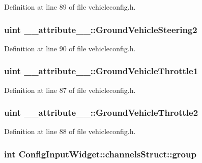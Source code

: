 \-Definition at line 89 of file vehicleconfig.\-h.

\hypertarget{group___config_plugin_gab404016de72261d048356e628b9ef0b7}{
\subsubsection[{\-Ground\-Vehicle\-Steering2}]{\setlength{\rightskip}{0pt plus 5cm}uint {\bf \-\_\-\-\_\-attribute\-\_\-\-\_\-\-::\-Ground\-Vehicle\-Steering2}}}\label{group___config_plugin_gab404016de72261d048356e628b9ef0b7}


\-Definition at line 90 of file vehicleconfig.\-h.

\hypertarget{group___config_plugin_ga755435654b7373fe879e991ccdd40757}{
\subsubsection[{\-Ground\-Vehicle\-Throttle1}]{\setlength{\rightskip}{0pt plus 5cm}uint {\bf \-\_\-\-\_\-attribute\-\_\-\-\_\-\-::\-Ground\-Vehicle\-Throttle1}}}\label{group___config_plugin_ga755435654b7373fe879e991ccdd40757}


\-Definition at line 87 of file vehicleconfig.\-h.

\hypertarget{group___config_plugin_ga6a8ae4214756c689b83b9f42a56c2505}{
\subsubsection[{\-Ground\-Vehicle\-Throttle2}]{\setlength{\rightskip}{0pt plus 5cm}uint {\bf \-\_\-\-\_\-attribute\-\_\-\-\_\-\-::\-Ground\-Vehicle\-Throttle2}}}\label{group___config_plugin_ga6a8ae4214756c689b83b9f42a56c2505}


\-Definition at line 88 of file vehicleconfig.\-h.

\hypertarget{group___config_plugin_gaebb67a5da44805269356236983a8c2d2}{
\subsubsection[{group}]{\setlength{\rightskip}{0pt plus 5cm}int \-Config\-Input\-Widget\-::channels\-Struct\-::group}}\label{group___config_plugin_gaebb67a5da44805269356236983a8c2d2}



